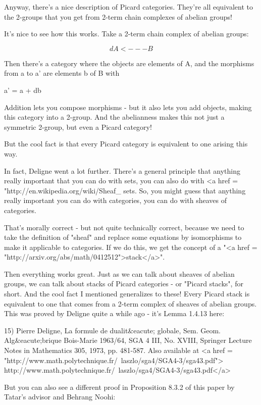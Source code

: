 Anyway, there's a nice description of Picard categories.  They're all
equivalent to the 2-groups that you get from 2-term chain complexes of
abelian groups!

It's nice to see how this works.  Take a 2-term chain complex of
abelian groups:


$$

    d
A <--- B
$$
    

Then there's a category where the objects are elements of A, and 
the morphisms from a to a' are elements b of B with 

a' = a + db

Addition lets you compose morphisms - but it also lets you add
objects, making this category into a 2-group.  And the abelianness
makes this not just a symmetric 2-group, but even a Picard category!

But the cool fact is that every Picard category is equivalent to 
one arising this way.  

In fact, Deligne went a lot further.  There's a general principle that
anything really important that you can do with sets, you can also do
with <a href =
"http://en.wikipedia.org/wiki/Sheaf_%
sets.  So, you might guess that anything really important you can do
with categories, you can do with sheaves of categories.

That's morally correct - but not quite technically correct, because we
need to take the definition of "sheaf" and replace some
equations by isomorphisms to make it applicable to categories.  If we
do this, we get the concept of a "<a href =
"http://arxiv.org/abs/math/0412512">stack</a>".

Then everything works great.  Just as we can talk about sheaves of
abelian groups, we can talk about stacks of Picard categories - or
"Picard stacks", for short.  And the cool fact I mentioned
generalizes to these!  Every Picard stack is equivalent to one that
comes from a 2-term complex of sheaves of abelian groups.  This was
proved by Deligne quite a while ago - it's Lemma 1.4.13 here:

15) Pierre Deligne, La formule de dualit&eacute; globale,
Sem. Geom. Alg&eacute;brique Bois-Marie 1963/64, SGA 4 III, No. XVIII, 
Springer Lecture Notes in Mathematics 305, 1973, pp. 481-587.
Also available at
<a href = "http://www.math.polytechnique.fr/~laszlo/sga4/SGA4-3/sga43.pdf">
http://www.math.polytechnique.fr/~laszlo/sga4/SGA4-3/sga43.pdf</a>

But you can also see a different proof in Proposition 8.3.2 of
this paper by Tatar's advisor and Behrang Noohi:

